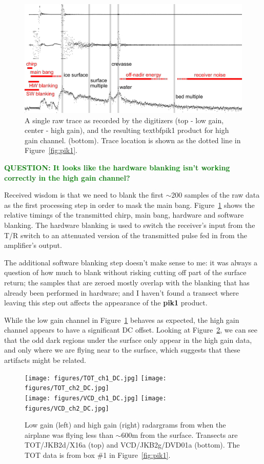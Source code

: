 \documentclass[11pt]{article}
\newcommand{\question}[1]{\ifthenelse{\boolean{include-questions}} {\textcolor{Green}{\textbf{QUESTION: #1}}}{}}
\newcommand{\figref}[1]{Figure~\ref{#1}}
\begin{document}
\begin{figure}[ht!]
\centering
\includegraphics[width=1.0\columnwidth]{figures/trace.jpg}
\caption[]{A single raw trace as recorded by the digitizers (top - low gain, center - high gain), and the resulting textbf{pik1} product for high gain channel. (bottom). Trace location is shown as the dotted line in \figref{fig:pik1}.}
\label{fig:trace}
\end{figure}

\question{It looks like the hardware blanking isn't working correctly in the high gain channel?}

Received wisdom is that we need to blank the first $\sim$200 samples of the raw data as the first processing step in order to mask the main bang. \figref{fig:trace} shows the relative timings of the transmitted chirp, main bang, hardware and software blanking. The hardware blanking is used to switch the receiver's input from the T/R switch to an attenuated version of the transmitted pulse fed in from the amplifier's output. 

The additional software blanking step doesn't make sense to me: it was always a question of how much to blank without risking cutting off part of the surface return; the samples that are zeroed mostly overlap with the blanking that has already been performed in hardware; and I haven't found a transect where leaving this step out affects the appearance of the \textbf{pik1} product.

While the low gain channel in \figref{fig:trace} behaves as expected, the high gain channel appears to have a significant DC offset. Looking at \figref{fig:ch2_DC_artifact}, we can see that the odd dark regions under the surface only appear in the high gain data, and only where we are flying near to the surface, which suggests that these artifacts might be related. 

\begin{figure}[ht!]
\centering
\texttt{[image: figures/TOT\_ch1\_DC.jpg]}
\texttt{[image: figures/TOT\_ch2\_DC.jpg]} \\
\vspace{2pt}
\texttt{[image: figures/VCD\_ch1\_DC.jpg]}
\texttt{[image: figures/VCD\_ch2\_DC.jpg]}
\caption[]{Low gain (left) and high gain (right) radargrams from when the airplane was flying less than $\sim$600m from the surface. Transects are TOT/JKB2d/X16a (top) and VCD/JKB2g/DVD01a (bottom). The TOT data is from box \#1 in \figref{fig:pik1}.}
\label{fig:ch2_DC_artifact}
\end{figure}
\end{document}
